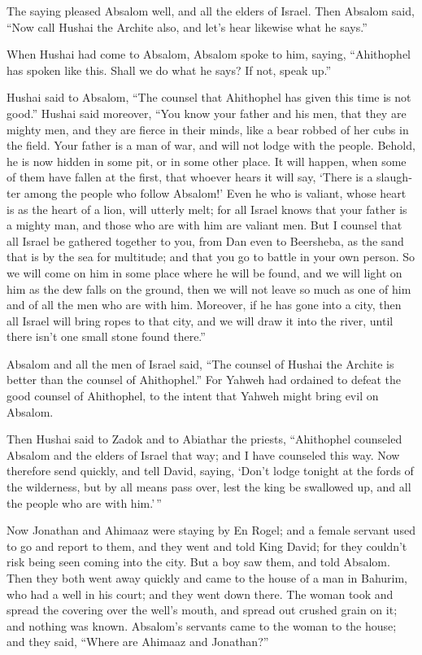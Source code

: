 \begin{paracol}{2}
\begin{otherlanguage}{english}
 The saying pleased Absalom well, and all the elders of
Israel.  Then Absalom said, ``Now call Hushai the Archite
also, and let's hear likewise what he says.''

 When Hushai had come to Absalom, Absalom spoke to him,
saying, ``Ahithophel has spoken like this. Shall we do what he says? If
not, speak up.''

 Hushai said to Absalom, ``The counsel that Ahithophel has
given this time is not good.''  Hushai said moreover,
``You know your father and his men, that they are mighty men, and they
are fierce in their minds, like a bear robbed of her cubs in the field.
Your father is a man of war, and will not lodge with the people.
 Behold, he is now hidden in some pit, or in some other
place. It will happen, when some of them have fallen at the first, that
whoever hears it will say, `There is a slaughter among the people who
follow Absalom!'  Even he who is valiant, whose heart is
as the heart of a lion, will utterly melt; for all Israel knows that
your father is a mighty man, and those who are with him are valiant men.
 But I counsel that all Israel be gathered together to
you, from Dan even to Beersheba, as the sand that is by the sea for
multitude; and that you go to battle in your own person. 
So we will come on him in some place where he will be found, and we will
light on him as the dew falls on the ground, then we will not leave so
much as one of him and of all the men who are with him. 
Moreover, if he has gone into a city, then all Israel will bring ropes
to that city, and we will draw it into the river, until there isn't one
small stone found there.''

 Absalom and all the men of Israel said, ``The counsel of
Hushai the Archite is better than the counsel of Ahithophel.'' For
Yahweh had ordained to defeat the good counsel of Ahithophel, to the
intent that Yahweh might bring evil on Absalom.

 Then Hushai said to Zadok and to Abiathar the priests,
``Ahithophel counseled Absalom and the elders of Israel that way; and I
have counseled this way.  Now therefore send quickly, and
tell David, saying, `Don't lodge tonight at the fords of the wilderness,
but by all means pass over, lest the king be swallowed up, and all the
people who are with him.'\,''

 Now Jonathan and Ahimaaz were staying by En Rogel; and a
female servant used to go and report to them, and they went and told
King David; for they couldn't risk being seen coming into the city.
 But a boy saw them, and told Absalom. Then they both
went away quickly and came to the house of a man in Bahurim, who had a
well in his court; and they went down there.  The woman
took and spread the covering over the well's mouth, and spread out
crushed grain on it; and nothing was known.  Absalom's
servants came to the woman to the house; and they said, ``Where are
Ahimaaz and Jonathan?''


\end{otherlanguage}
\end{paracol}
